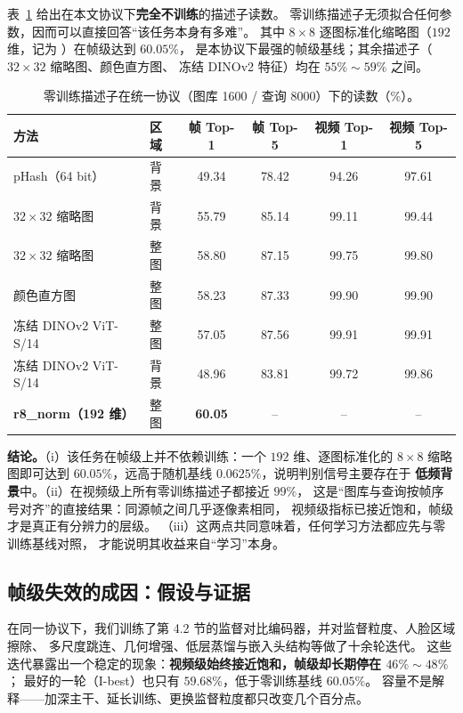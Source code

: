 表~\ref{tab:zero} 给出在本文协议下\textbf{完全不训练}的描述子读数。
零训练描述子无须拟合任何参数，因而可以直接回答“该任务本身有多难”。
其中 $8\times8$ 逐图标准化缩略图（$192$ 维，记为 ）在帧级达到 $60.05\%$，
是本协议下最强的帧级基线；其余描述子（$32\times32$ 缩略图、颜色直方图、
冻结 DINOv2 特征）均在 $55\%\sim59\%$ 之间。

\begin{table}[t]
\centering
\caption{零训练描述子在统一协议（图库 1600 / 查询 8000）下的读数（\%）。}
\label{tab:zero}
\small
\begin{tabular}{llcccc}
\toprule
方法 & 区域 & 帧 Top-1 & 帧 Top-5 & 视频 Top-1 & 视频 Top-5 \\
\midrule
pHash（64 bit）              & 背景 & 49.34 & 78.42 & 94.26 & 97.61 \\
$32\times32$ 缩略图          & 背景 & 55.79 & 85.14 & 99.11 & 99.44 \\
$32\times32$ 缩略图          & 整图 & 58.80 & 87.15 & 99.75 & 99.80 \\
颜色直方图                   & 整图 & 58.23 & 87.33 & 99.90 & 99.90 \\
冻结 DINOv2 ViT-S/14\cite{oquab2024dinov2} & 整图 & 57.05 & 87.56 & 99.91 & 99.91 \\
冻结 DINOv2 ViT-S/14         & 背景 & 48.96 & 83.81 & 99.72 & 99.86 \\
\textbf{r8\_norm（192 维）}   & 整图 & \textbf{60.05} & -- & -- & -- \\
\bottomrule
\end{tabular}
\end{table}

\textbf{结论。}（i）该任务在帧级上并不依赖训练：一个 $192$ 维、逐图标准化的 $8\times8$
缩略图即可达到 $60.05\%$，远高于随机基线 $0.0625\%$，说明判别信号主要存在于
\textbf{低频背景}中。（ii）在视频级上所有零训练描述子都接近 $99\%$，
这是“图库与查询按帧序号对齐”的直接结果：同源帧之间几乎逐像素相同，
视频级指标已接近饱和，帧级才是真正有分辨力的层级。
（iii）这两点共同意味着，任何学习方法都应先与零训练基线对照，
才能说明其收益来自“学习”本身。

\subsection{帧级失效的成因：假设与证据}
\label{sec:rounds}

在同一协议下，我们训练了第 4.2 节的监督对比编码器，并对监督粒度、人脸区域擦除、
多尺度跳连、几何增强、低层蒸馏与嵌入头结构等做了十余轮迭代。
这些迭代暴露出一个稳定的现象：\textbf{视频级始终接近饱和，帧级却长期停在 $46\%\sim48\%$}；
最好的一轮（I-best）也只有 $59.68\%$，低于零训练基线 $60.05\%$。
容量不是解释——加深主干、延长训练、更换监督粒度都只改变几个百分点。

